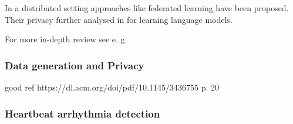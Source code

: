 In a distributed setting approaches like federated learning \parencite{konečný2015federated,Mo2019EfficientAP} have been proposed. Their privacy further analysed in \parencite{mcmahan2018learning} for learning language models.

\vspace*{1em}
For more in-depth review see e. g. \parencite{surrve_ppml,surv_ppml_2,wang2023differential}


\subsubsection*{Data generation and Privacy}

good ref https://dl.acm.org/doi/pdf/10.1145/3436755 p. 20

\subsubsection*{Heartbeat arrhythmia detection}